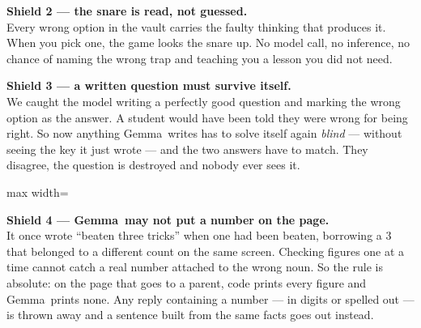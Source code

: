 \documentclass[11pt]{article}
\newcommand{\themodel}{Gemma}
\begin{document}
\begin{shieldbox}
\textbf{Shield 2 --- the snare is read, not guessed.}\\
Every wrong option in the vault carries the faulty thinking that produces it.
When you pick one, the game looks the snare up. No model call, no inference, no
chance of naming the wrong trap and teaching you a lesson you did not need.
\end{shieldbox}

\begin{shieldbox}
\textbf{Shield 3 --- a written question must survive itself.}\\
We caught the model writing a perfectly good question and marking the wrong
option as the answer. A student would have been told they were wrong for being
right. So now anything \themodel\ writes has to solve itself again \emph{blind}
--- without seeing the key it just wrote --- and the two answers have to match.
They disagree, the question is destroyed and nobody ever sees it.
\end{shieldbox}

\vspace{0.4em}
\begin{center}
\begin{adjustbox}{max width=\textwidth}
\end{adjustbox}
\end{center}

\begin{shieldbox}
\textbf{Shield 4 --- \themodel\ may not put a number on the page.}\\
It once wrote ``beaten three tricks'' when one had been beaten, borrowing a 3
that belonged to a different count on the same screen. Checking figures one at
a time cannot catch a real number attached to the wrong noun. So the rule is
absolute: on the page that goes to a parent, code prints every figure and
\themodel\ prints none. Any reply containing a number --- in digits or spelled
out --- is thrown away and a sentence built from the same facts goes out
instead.
\end{shieldbox}
\end{document}
